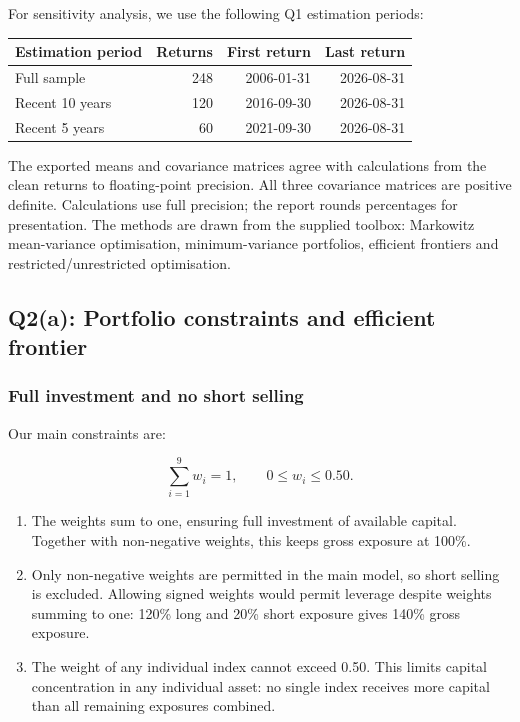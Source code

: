 \documentclass[
  10pt,
  a4paper,
]{article}
\providecommand{\tightlist}{%
  \setlength{\itemsep}{0pt}\setlength{\parskip}{0pt}}
\begin{document}
For sensitivity analysis, we use the following Q1 estimation periods:

\begin{longtable}[]{@{}lrrr@{}}
\toprule\noalign{}
Estimation period & Returns & First return & Last return \\
\midrule\noalign{}
\endhead
\bottomrule\noalign{}
\endlastfoot
Full sample & 248 & 2006-01-31 & 2026-08-31 \\
Recent 10 years & 120 & 2016-09-30 & 2026-08-31 \\
Recent 5 years & 60 & 2021-09-30 & 2026-08-31 \\
\end{longtable}

The exported means and covariance matrices agree with calculations from
the clean returns to floating-point precision. All three covariance
matrices are positive definite. Calculations use full precision; the
report rounds percentages for presentation. The methods are drawn from
the supplied toolbox: Markowitz mean-variance optimisation,
minimum-variance portfolios, efficient frontiers and
restricted/unrestricted optimisation.

\newpage

\hypertarget{q2a-portfolio-constraints-and-efficient-frontier}{%
\subsection{Q2(a): Portfolio constraints and efficient
frontier}\label{q2a-portfolio-constraints-and-efficient-frontier}}

\hypertarget{full-investment-and-no-short-selling}{%
\subsubsection{Full investment and no short
selling}\label{full-investment-and-no-short-selling}}

Our main constraints are:

\[
\sum_{i=1}^{9}w_i=1,\qquad 0\leq w_i\leq0.50.
\]

\begin{enumerate}
\def\labelenumi{\arabic{enumi}.}
\tightlist
\item
  The weights sum to one, ensuring full investment of available capital.
  Together with non-negative weights, this keeps gross exposure at
  100\%.
\item
  Only non-negative weights are permitted in the main model, so short
  selling is excluded. Allowing signed weights would permit leverage
  despite weights summing to one: 120\% long and 20\% short exposure
  gives 140\% gross exposure.
\item
  The weight of any individual index cannot exceed 0.50. This limits
  capital concentration in any individual asset: no single index
  receives more capital than all remaining exposures combined.
\end{enumerate}
\end{document}
